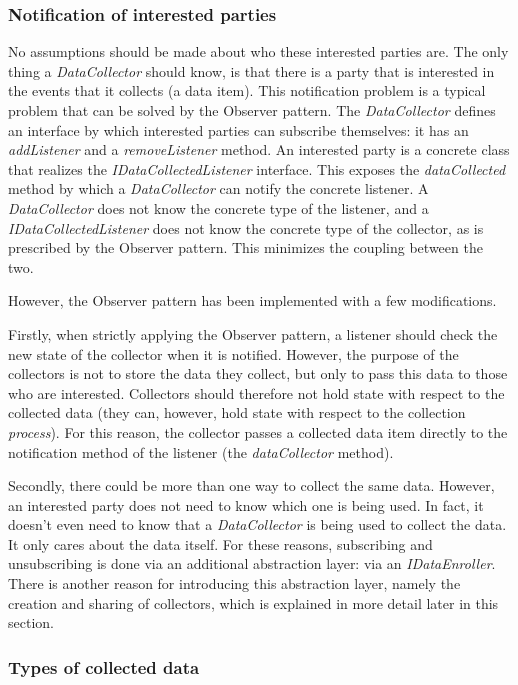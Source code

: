 \documentclass[i2]{oss}
\newcommand{\class}[1]{\emph{#1}}
\newcommand{\method}[1]{\emph{#1}}
\begin{document}
\subsubsection{Notification of interested parties}

No assumptions should be made about who these interested parties are.
The only thing a \class{DataCollector} should  know, is that there is a party that is interested in the events that it collects (a data item).
This notification problem is a typical problem that can be solved by the Observer pattern.
The \class{DataCollector} defines an interface by which interested parties can subscribe themselves: it has an \method{addListener} and a \method{removeListener} method. 
An interested party is a concrete class that realizes the \class{IDataCollectedListener} interface. This exposes the \method{dataCollected} method by which a \class{DataCollector} can notify the concrete listener.
A \class{DataCollector} does not know the concrete type of the listener, and a \class{IDataCollectedListener} does not know the concrete type of the collector, as is prescribed by the Observer pattern.
This minimizes the coupling between the two.

However, the Observer pattern has been implemented with a few modifications.

Firstly, when strictly applying the Observer pattern, a listener should check the new state of the collector when it is notified.
However, the purpose of the collectors is not to store the data they collect, but only to pass this data to those who are interested.
Collectors should therefore not hold state with respect to the collected data (they can, however, hold state with respect to the collection \emph{process}). 
For this reason, the collector passes a collected data item directly to the notification method of the listener (the \method{dataCollector} method).

Secondly, there could be more than one way to collect the same data.
However, an interested party does not need to know which one is being used.
In fact, it doesn't even need to know that a \class{DataCollector} is being used to collect the data.
It only cares about the data itself.
For these reasons, subscribing and unsubscribing is done via an additional abstraction layer: via an \class{IDataEnroller}.
There is another reason for introducing this abstraction layer, namely the creation and sharing of collectors, which is explained in more detail later in this section.

\subsubsection{Types of collected data}
\end{document}
